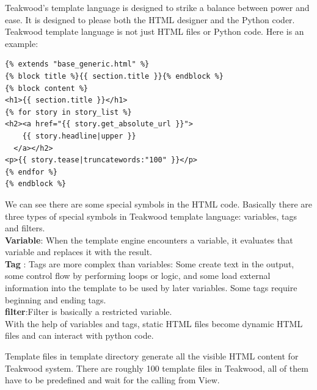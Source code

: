 Teakwood’s template language is designed to strike a balance between power and ease. It is designed to please both the HTML designer and the Python coder. Teakwood template language is not just HTML files or Python code. Here is an example:\\

\begin{verbatim}
{% extends "base_generic.html" %}
{% block title %}{{ section.title }}{% endblock %}
{% block content %}
<h1>{{ section.title }}</h1>
{% for story in story_list %}
<h2><a href="{{ story.get_absolute_url }}">
    {{ story.headline|upper }}
  </a></h2>
<p>{{ story.tease|truncatewords:"100" }}</p>
{% endfor %}
{% endblock %}
\end{verbatim}

We can see there are some special symbols in the HTML code. Basically there are three types of special symbols in Teakwood template language: variables, tags and filters.\\

\textbf{Variable}: When the template engine encounters a variable, it evaluates that variable and replaces it with the result.\\
\textbf{Tag }: Tags are more complex than variables: Some create text in the output, some control flow by performing loops or logic, and some load external information into the template to be used by later variables. Some tags require beginning and ending tags. \\
\textbf{filter}:Filter is basically a restricted variable.\\

With the help of variables and tags, static HTML files become dynamic HTML files and can interact with python code.

Template files in template directory generate all the visible HTML content for Teakwood system. There are roughly 100 template files in Teakwood, all of them have to be predefined and wait for the calling from View.
